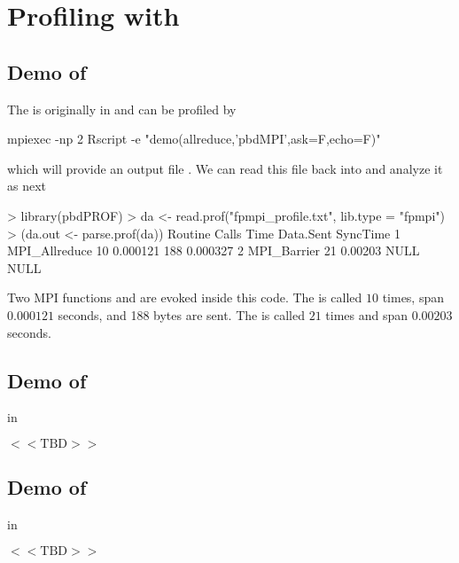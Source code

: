 \section{Profiling with }
\label{sec:ex_fpmpi}


\subsection{Demo of }

The  is originally in  and can be profiled
by
\begin{Code}
mpiexec -np 2 Rscript -e "demo(allreduce,'pbdMPI',ask=F,echo=F)"
\end{Code}
which will provide an output file .
We can read this file back into  and analyze it as next 
\begin{Output}
> library(pbdPROF)
> da <- read.prof("fpmpi_profile.txt", lib.type = "fpmpi")
> (da.out <- parse.prof(da))
        Routine Calls     Time Data.Sent SyncTime
1 MPI_Allreduce    10 0.000121       188 0.000327
2   MPI_Barrier    21  0.00203      NULL     NULL
\end{Output}
Two MPI  functions  and  are
evoked inside this  code. The  is called $10$
times, span $0.000121$ seconds, and 188 bytes are sent.
The  is called $21$ times and span $0.00203$ seconds.


\subsection{Demo of }

 in ~\citep{Schmidt2012pbdBASEpackage}

$<<\mbox{TBD}>>$


\subsection{Demo of }

 in 

$<<\mbox{TBD}>>$
